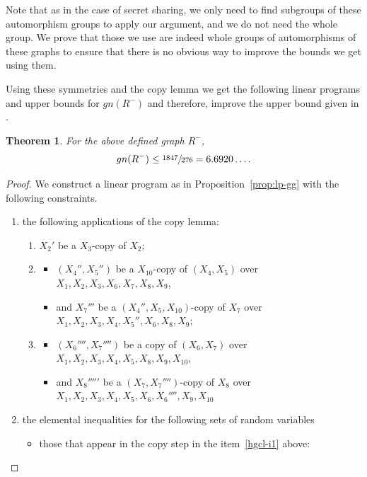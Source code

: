 \documentclass[11pt, a4paper]{kybernetika}
\newtheorem{theorem}{Theorem}[section]
\begin{document}
	Note that as in the case of secret sharing, we only need to find subgroups of these automorphism groups to apply our argument, and we do not need the whole group. We prove that those we use are indeed whole groups of automorphisms of these graphs to ensure that there is no obvious way to improve the bounds we get using them.
	
	Using these symmetries and the copy lemma we get the following linear programs and upper bounds for $gn(R^-)$ and therefore, improve the upper bound given in \cite{baber2016graph}.
	
	\begin{theorem}\label{th:R-}
		For the above defined graph $R^-$, $$gn(R^-)\le \sfrac{1847}{276}=6.6920\ldots.$$
	\end{theorem} 
	\begin{proof}
		We construct a linear program as in Proposition~\ref{prop:lp-gg} with the following constraints.
		\begin{enumerate}
			\item the following applications of the copy lemma:
			\begin{enumerate}
				\item \label{hgcl-i1} $X_2'$ be a $X_3$-copy of $X_2$;
				\item \label{hgcl-i2} \begin{itemize}
					\item $(X_4'',X_5'')$ be a $X_{10}$-copy of $(X_4,X_5)$ over $X_1,X_2,X_3,X_6,X_7,X_8,X_9$,
					\item and $X_7'''$ be a $(X_4'',X_5,X_{10})$-copy of $X_7$ over $X_1,X_2,X_3,X_4,X_5'',X_6,X_8,X_9$;
				\end{itemize}
				\item \label{hgcl-i3} \begin{itemize}
					\item $(X_6'''',X_7'''')$ be a copy of $(X_6,X_7)$ over $X_1,X_2,X_3,X_4,X_5,X_8,X_9,X_{10}$,
					\item and $X_8'''''$ be a $(X_7,X_7'''')$-copy of $X_8$ over $X_1,X_2,X_3,X_4,X_5,X_6,X_6'''',X_9,X_{10}$
				\end{itemize}
			\end{enumerate}
			\item the elemental inequalities for the following sets of random variables
			\begin{itemize}
				\item those that appear in the copy step in the item~\ref{hgcl-i1} above: 
				

\end{itemize}
\end{enumerate}
\end{proof}
\end{document}
